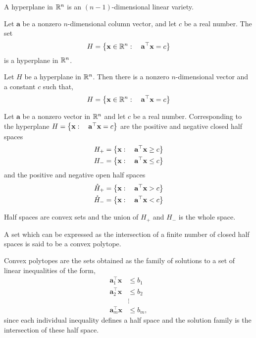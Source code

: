 \begin{definition}
	A hyperplane in $\mathbb{R}^n$ is an $(n-1)$-dimensional linear variety.
\end{definition}

\begin{proposition}
	Let $\mathbf{a}$ be a nonzero $n$-dimensional column vector, and let $c$ be a real number. The set
	\begin{equation*}
		H=\left\lbrace \mathbf{x}\in \mathbb{R}^n:\quad \mathbf{a}^\top \mathbf{x}=c \right\rbrace
	\end{equation*}
	is a hyperplane in $\mathbb{R}^n$.
\end{proposition}

\begin{proposition}
	Let $H$ be a hyperplane in $\mathbb{R}^n$. Then there is a nonzero $n$-dimensional vector and a constant $c$ such that,
	\begin{equation*}
		H=\left\lbrace \mathbf{x}\in\mathbb{R}^n:\quad \mathbf{a}^\top \mathbf{x}=c \right\rbrace
	\end{equation*}
\end{proposition}

\begin{definition}
	Let $\mathbf{a}$ be a nonzero vector in $\mathbb{R}^n$ and let $c$ be a real number. Corresponding to the hyperplane $H=\left\lbrace \mathbf{x}:\quad \mathbf{a}^\top \mathbf{x}=c \right\rbrace$ are the positive and negative closed half spaces 
	\begin{align*}
		H_+ = \left\lbrace \mathbf{x}:\quad \mathbf{a}^\top \mathbf{x}\geq c \right\rbrace\\
		H_- = \left\lbrace \mathbf{x}:\quad \mathbf{a}^\top \mathbf{x}\leq c \right\rbrace
	\end{align*}
	and the positive and negative open half spaces
	\begin{align*}
	\mathring{H}_+ = \left\lbrace \mathbf{x}:\quad \mathbf{a}^\top \mathbf{x}> c \right\rbrace\\
	\mathring{H}_- = \left\lbrace \mathbf{x}:\quad \mathbf{a}^\top \mathbf{x}< c \right\rbrace
	\end{align*}
\end{definition}

Half spaces are convex sets and the union of $H_+$ and $H_-$ is the whole space.


\begin{definition}
	A set which can be expressed as the intersection of a finite number of closed half spaces is said to be a convex polytope.
\end{definition}

Convex polytopes are the sets obtained as the family of solutions to a set of linear inequalities of the form,
\begin{align*}
	\mathbf{a}_1^\top \mathbf{x}&\leq b_1 \\
	\mathbf{a}_2^\top \mathbf{x}&\leq b_2 \\
	&\vdots \\
	\mathbf{a}_m^\top \mathbf{x}&\leq b_m,
\end{align*}
since each individual inequality defines a half space and the solution family is the intersection of these half space. 

